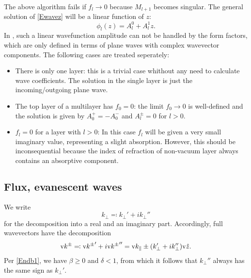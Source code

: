 The above algorithm fails if $f_l\to0$
because $M_{l+1}$ becomes singular.
The general solution of \cref{Ewavez} will be a linear function of $z$:
\begin{equation}\label{Ephilz}
  \phi_l(z) = A^0_l + A^1_lz.
\end{equation}
In \BornAgain, such a linear wavefunction amplitude can not be handled by the form factors,
which are only defined in terms of plane waves with complex wavevector components.
The following cases are treated seperately:
\begin{itemize}
  \item There is only one layer: this is a trivial case whithout any need to calculate wave coefficients.
    The solution in the single layer is just the incoming/outgoing plane wave.
  \item The top layer of a multilayer has $f_0=0$: the limit $f_0\to0$ is well-defined and the
    solution is given by $A^+_0 = -A^-_0$ and $A^{\pm}_l=0$ for $l>0$.
  \item $f_l=0$ for a layer with $l>0$: In this case $f_l$ will be given a very small imaginary value,
    representing a slight absorption. However, this should be inconsequential because the index of refraction
    of non-vacuum layer always contains an absorptive component.
\end{itemize}

\subsection{Flux, evanescent waves}\label{SSpecial}

We write
\begin{equation}\label{Edecompkperp}
  k_\perp \eqqcolon k_\perp' + i k_\perp''
\end{equation}
for the decomposition into a real and an imaginary part.
Accordingly, full wavevectors have the decomposition
\begin{equation}
  \text{v}{k}^\pm
  \eqqcolon {\text{v}{k}^\pm}' + i{\text{v}{k}^\pm}''
  = \text{v}{k}_\parallel \pm (k_\perp' + i k_\perp'')\text{v}{\hat z}.
\end{equation}
Per \cref{Endb1}, we have $\beta\ge0$ and $\delta<1$,
from which it follows that $k_\perp''$ always has the same sign as $k_\perp'$.


